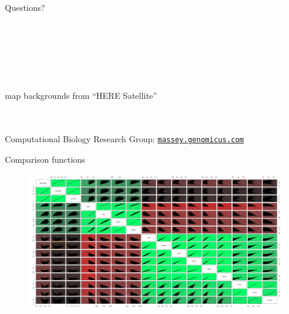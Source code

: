 \documentclass[10pt, aspectratio=43]{beamer}
\begin{document}

\begin{frame}[plain]

    \begin{Huge}
      Questions?
    \end{Huge}
    \\~\\~\\~\\~\\
    \begin{small}
      \color{lightgray}
      map backgrounds from “HERE Satellite”
    \end{small}
    \\~\\
    Computational Biology Research Group: \href{http://massey.genomicus.com}{\texttt{massey.genomicus.com}}

\end{frame}


\begin{frame}{}{Comparison functions}
\begin{figure}
  \hspace*{-1cm}
  \includegraphics[width=1.17\textwidth]{../data/comparisonFunctions.png}
\end{figure}
\end{frame}
\end{document}
